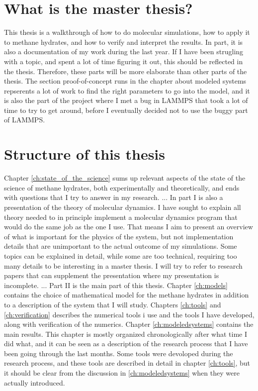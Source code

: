 \section{What is the master thesis?}
This thesis is a walkthrough of how to do molecular simulations, how to apply it to methane hydrates, and how to verify and interpret the results. In part, it is also a documentation of my work during the last year. If I have been strugling with a topic, and spent a lot of time figuring it out, this should be reflected in the thesis. Therefore, these parts will be more elaborate than other parts of the thesis. The section proof-of-concept runs in the chapter about modeled systems repserents a lot of work to find the right parameters to go into the model, and it is also the part of the project where I met a bug in LAMMPS that took a lot of time to try to get around, before I eventually decided not to use the buggy part of LAMMPS.


\section{Structure of this thesis}

Chapter \ref{ch:state_of_the_science} sums up relevant aspects of the state of the science of methane hydrates, both experimentally and theoretically, and ends with questions that I try to answer in my research.
...
In part I is also a presentation of the theory of molecular dynamics. I have sought to explain all theory needed to in principle implement a molecular dynamics program that would do the same job as the one I use. That means I aim to present an overview of what is important for the physics of the system, but not implementation details that are unimportant to the actual outcome of my simulations. Some topics can be explained in detail, while some are too technical, requiring too many details to be interesting in a master thesis. I will try to refer to research papers that can supplement the presentation where my presentation is incomplete.
...
Part II is the main part of this thesis. Chapter \ref{ch:models} contains the choice of mathematical model for the methane hydrates in addition to a description of the system that I will study. Chapters \ref{ch:tools} and \ref{ch:verification} describes the numerical tools i use and the tools I have developed, along with verification of the numerics. Chapter \ref{ch:modeledsystems} contains the main results. This chapter is mostly organized chronologically after what time I did what, and it can be seen as a description of the research process that I have been going through the last months. Some tools were devoloped during the research process, and these tools are described in detail in chapter \ref{ch:tools}, but it should be clear from the discussion in \ref{ch:modeledsystems} when they were actually introduced.


